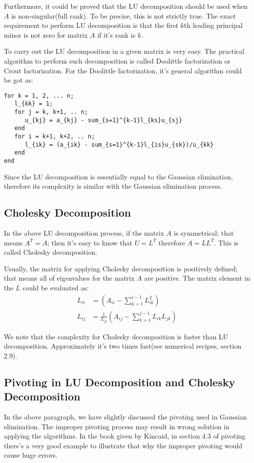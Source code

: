 Furthermore, it could be proved that the LU decomposition
should be used when $A$ is non-singular(full rank). To be
precise, this is not strictly true. The exact requirement 
to perform LU decomposition is that the first $k$th leading 
principal minor is not zero for matrix $A$ if it's rank is $k$. 

To carry out the LU decomposition in a given matrix is very easy.
The practical algorithm to perform such decomposition is called 
Doolittle factorization or Crout factorization. For the Doolittle 
factorization, it's general algorithm could be got as:
\begin{verbatim}
for k = 1, 2, ... n;
   l_{kk} = 1;
   for j = k, k+1, .. n;
      u_{kj} = a_{kj} - sum_{s=1}^{k-1}l_{ks}u_{sj}
   end
   for i = k+1, k+2, .. n;
      l_{ik} = (a_{ik} - sum_{s=1}^{k-1}l_{is}u_{sk})/u_{kk}
   end   
end
\end{verbatim} 

Since the LU decomposition is essentially equal to the Gaussian
elimination, therefore its complexity is similar with the Gaussian 
elimination process.


\subsection{Cholesky Decomposition}
%
%
%
In the above LU decomposition process, if the matrix $A$ is symmetrical;
that means $A^{T} = A$; then it's easy to know that $U = L^{T}$ therefore
$A = LL^{T}$. This is called Cholesky decomposition.

Usually, the matrix for applying Cholesky decomposition is positively defined;
that means all of eigenvalues for the matrix $A$ are positive. The matrix element
in the $L$ could be evaluated as:
\begin{align}
 L_{ii} &= \left( A_{ii} - \sum_{k=1}^{i-1}L_{ik}^{2}\right) \nonumber \\
 L_{ij} &= \frac{1}{L_{jj}}\left( A_{ij} - \sum_{k=1}^{j-1}L_{ik}L_{jk} \right) 
\end{align}

We note that the complexity for Cholesky decomposition is faster than LU decomposition.
Approximately it's two times fast(see numerical recipes, section 2.9).

\subsection{Pivoting in LU Decomposition and Cholesky Decomposition}
%
%
%
In the above paragraph, we have slightly discussed the pivoting used in Gaussian elimination.
The improper pivoting process may result in wrong solution in applying the algorithms. In
the book given by Kincaid, in section 4.3 of pivoting there's a very good example to illustrate
that why the improper pivoting would cause huge errors.

